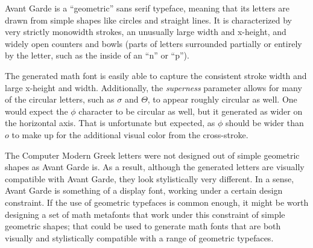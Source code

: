 
Avant Garde is a ``geometric'' sans serif typeface, meaning that its letters are
drawn from simple shapes like circles and straight lines. It is characterized by
very strictly monowidth strokes, an unusually large width and x-height, and
widely open counters and bowls (parts of letters surrounded partially or
entirely by the letter, such as the inside of an ``n'' or ``p'').

The generated math font is easily able to capture the consistent stroke width
and large x-height and width. Additionally, the \emph{superness} parameter
allows for many of the circular letters, such as $\sigma$ and $\Theta$,  to
appear roughly circular as well. One would expect the $\phi$ character to be
circular as well, but it generated as wider on the horizontal axis. That is
unfortunate but expected, as $\phi$ should be wider than $o$ to make up for the
additional visual color from the cross-stroke.

The Computer Modern Greek letters were not designed out of simple geometric
shapes as Avant Garde is. As a result, although the generated letters are
visually compatible with Avant Garde, they look stylistically very different. In
a sense, Avant Garde is something of a display font, working under a certain
design constraint. If the use of geometric typefaces is common enough, it might
be worth designing a set of math metafonts that work under this constraint of
simple geometric shapes; that could be used to generate math fonts that are both
visually and stylistically compatible with a range of geometric typefaces.
